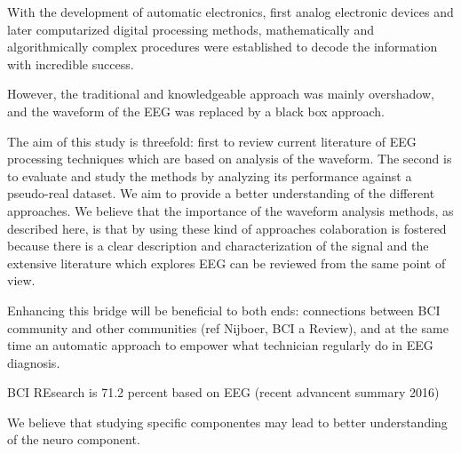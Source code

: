 \documentclass[sensors,article,submit,moreauthors,pdftex,10pt,a4paper]{mdpi}
\begin{document}
With the development of automatic electronics, first analog electronic devices and later computarized digital processing methods, mathematically and algorithmically complex procedures were established to decode the information with incredible success.

However, the traditional and knowledgeable approach was mainly overshadow, and the waveform of the EEG was replaced by a black box approach.

The aim of this study is threefold: first  to review current literature of EEG processing techniques which are based on analysis of the waveform.  The second is to evaluate and study the methods by analyzing its performance against a pseudo-real dataset. We aim to provide a better understanding of the different approaches.  We believe that the importance of the waveform analysis methods, as described here, is that by using these kind of approaches colaboration is fostered because there is a clear description and characterization of the signal and the extensive literature which explores EEG can be reviewed from the same point of view. 

Enhancing this bridge will be beneficial to both ends: connections between BCI community and other communities (ref Nijboer, BCI a Review), and at the same time an automatic approach to empower what technician regularly do in EEG diagnosis.

BCI REsearch is 71.2 percent based on EEG (recent advancent summary 2016)

We believe that studying specific componentes may lead to better understanding of the neuro component.

%
\end{document}
